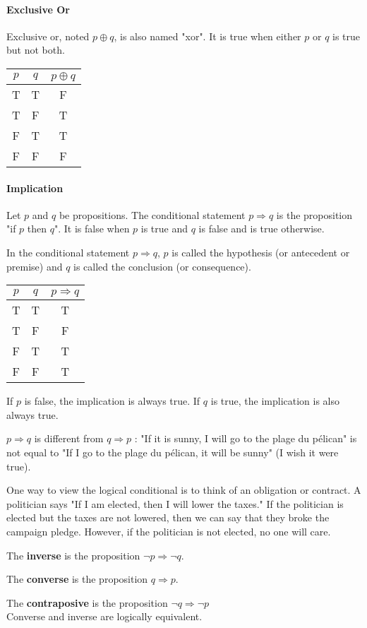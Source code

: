 \documentclass[10pt,a4paper]{book}
\begin{document}
\paragraph*{Exclusive Or}
Exclusive or, noted $p \oplus q$, is also named "xor". It is true when either $p$ or $q$ is true but not both.\\
\begin{tabular}{ |c  c | c| }
\hline
 $p$ & $q$ & $p\oplus q$\\
 \hline
 T & T & F \\ 
 T & F & T \\  
 F & T & T \\
 F & F & F \\
 \hline
\end{tabular}
\paragraph*{Implication}
Let $p$ and $q$ be propositions. The conditional statement $p \Rightarrow q$ is the proposition "if $p$ then $q$". It is false when $p$ is true and $q$ is false and is true otherwise.\par 
In the conditional statement $p \Rightarrow q$, $p$ is called the hypothesis (or antecedent or premise) and $q$ is called the conclusion (or consequence).\\
\begin{tabular}{ |c  c | c| }
\hline
 $p$ & $q$ & $p\Rightarrow q$\\
 \hline
 T & T & T \\ 
 T & F & F \\  
 F & T & T \\
 F & F & T \\
 \hline
\end{tabular}\par
If $p$ is false, the implication is always true. If $q$ is true, the implication is also always true.\par 
$p\Rightarrow q$ is different from $q\Rightarrow p$ : "If it is sunny, I will go to the plage du pélican" is not equal to "If I go to the plage du pélican, it will be sunny" (I wish it were true).\par 
One way to view the logical conditional is to think of an obligation or contract. A politician says "If I am elected, then I will lower the taxes." If the politician is elected but the taxes are not lowered, then we can say that they broke the campaign pledge. However, if the politician is not elected, no one will care.\par 
The \textbf{inverse} is the proposition $\neg p\Rightarrow\neg q$.\par
The \textbf{converse} is the proposition $q\Rightarrow p$.\par
The \textbf{contraposive} is the proposition $\neg q\Rightarrow\neg p$\\
Converse and inverse are logically equivalent.
\end{document}
